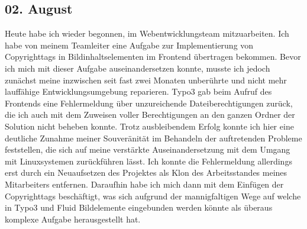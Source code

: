 \subsection{02. August}
Heute habe ich wieder begonnen, im Webentwicklungsteam mitzuarbeiten. Ich habe von meinem Teamleiter eine Aufgabe zur Implementierung von Copyrighttags in Bildinhaltselementen im Frontend übertragen bekommen. Bevor ich mich mit dieser Aufgabe auseinandersetzen konnte, musste ich jedoch zunächst meine inzwischen seit fast zwei Monaten unberührte und nicht mehr lauffähige Entwicklungsumgebung reparieren. Typo3 gab beim Aufruf des Frontends eine Fehlermeldung über unzureichende Dateiberechtigungen zurück, die ich auch mit dem Zuweisen voller Berechtigungen an den ganzen Ordner der Solution nicht beheben konnte. Trotz ausbleibendem Erfolg konnte ich hier eine deutliche Zunahme meiner Souveränität im Behandeln der auftretenden Probleme feststellen, die sich auf meine verstärkte Auseinandersetzung mit dem Umgang mit Linuxsystemen zurückführen lässt. Ich konnte die Fehlermeldung allerdings erst durch ein Neuaufsetzen des Projektes als Klon des Arbeitsstandes meines Mitarbeiters entfernen. Daraufhin habe ich mich dann mit dem Einfügen der Copyrighttags beschäftigt, was sich aufgrund der mannigfaltigen Wege auf welche in Typo3 und Fluid Bildelemente eingebunden werden könnte als überaus komplexe Aufgabe herausgestellt hat.
